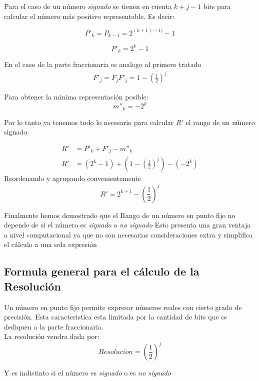 Para el caso de un n\'umero \textit{signado} se tienen en cuenta $k + j - 1$ bits para calcular el n\'umero m\'as positivo representable.
Es decir:

$$P'_{k} = P_{k-1} = 2^{ (k+1)-1)} -1$$

$$P'_{k} = 2^{k} -1$$

En el caso de la parte fraccionaria es analogo al primero tratado
\begin{align*}
F'_{j} = F_{j}
F'_{j} = 1 - \left(\frac{1}{2}\right)^j
\end{align*}



Para obtener la minima representaci\'on posible:
\begin{equation}
m''_{k} = -2^{k}
\end{equation}

Por lo tanto ya tenemos todo lo necesario para calcular $R'$ el rango de un n\'umero signado:

\begin{align*}
R' &= P'_{k} + F'_{j} - m''_{k} \\
R' &= \left(2^{k} -1\right) + \left(1 - \left(\frac{1}{2}\right)^j\right) - \left(-2^{k}\right)
\end{align*}
 Reordenando y agrupando convenientemente
 $$R' = 2^{k+1} - \left(\frac{1}{2}\right)^j$$
 
Finalmente hemos demostrado que el Rango de un n\'umero en punto fijo no depende de si el n\'umero es \textit{signado} o \textit{no signado}
Esto presenta una gran ventaja a nivel computacional ya que no son necesarias consideraciones extra y simplifica el c\'alculo a una sola expresi\'on

\subsection{Formula general para el c\'alculo de la Resoluci\'on}
Un n\'umero en punto fijo permite expresar n\'umeros reales con cierto grado de precisi\'on. Esta caracteristica esta limitada por la cantidad de bits que se dediquen a la parte fraccionaria.
\\
\indent La resoluci\'on vendra dada por:
\begin{equation}
Resoluci\acute{o}n = \left(\frac{1}{2}\right)^j
\end{equation}

Y es indistinto si el n\'umero es \textit{signado} o es \textit{no signado}

 
 
 
%



